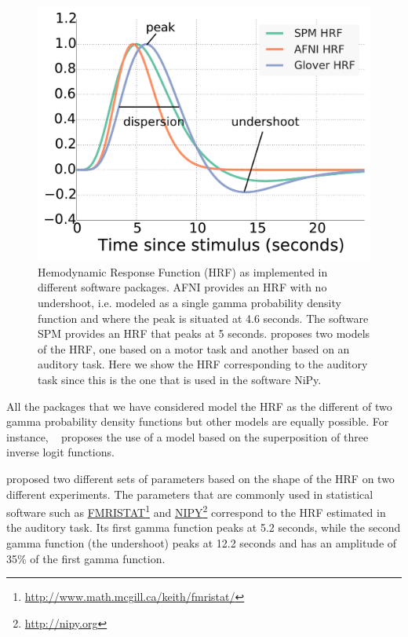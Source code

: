 \begin{figure}
\includegraphics[width=1.\linewidth]{figures/chapter_1/canonical_hrf.pdf}
\hspace{-20pt}\caption{Hemodynamic Response Function (HRF) as implemented in different software packages. AFNI provides an HRF with no undershoot, i.e. modeled as a single gamma probability density function and where the peak is situated at 4.6 seconds. The software SPM provides an HRF that peaks at 5 seconds. \citet{Glover1999} proposes two models of the HRF, one based on a motor task and another based on an auditory task. Here we show the HRF corresponding to the auditory task since this is the one that is used in the software NiPy.}\label{fig:hrf_models}
\end{figure}




All the packages that we have considered model the HRF as the different of two gamma probability density functions but other models are equally possible. For instance, ~\citep{lindquist2009modeling} proposes the use of a model based on the superposition of three inverse logit functions.


\citet*{Glover1999} proposed two different sets of parameters based on the shape of the HRF on two different experiments. The parameters that are commonly used in statistical software such as \href{http://www.math.mcgill.ca/keith/fmristat/}{FMRISTAT}\footnote{\href{http://www.math.mcgill.ca/keith/fmristat/}{http://www.math.mcgill.ca/keith/fmristat/}} and \href{http://nipy.org}{NIPY}\footnote{\href{http://nipy.org}{http://nipy.org}} correspond to the HRF estimated in the auditory task. Its first gamma function peaks at 5.2 seconds, while the second gamma function (the undershoot) peaks at 12.2 seconds and has an amplitude of 35\% of the first gamma function. 

